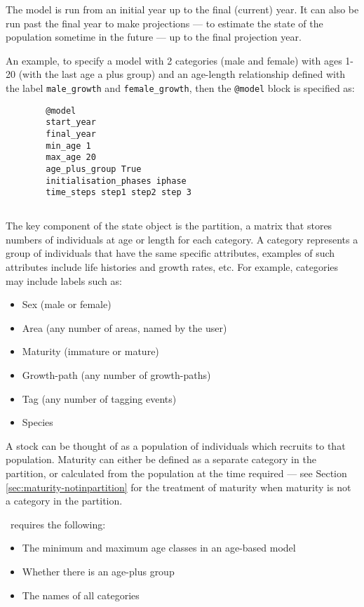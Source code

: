 The model is run from an initial year up to the final (current) year. It can also be run past the final year to make projections --- to estimate the state of the population sometime in the future --- up to the final projection year.

An example, to specify a model with 2 categories (male and female) with ages 1-20 (with the last age a plus group) and an age-length relationship defined with the label \texttt{male\_growth} and \texttt{female\_growth}, then the \texttt{@model} block is specified as:
{\small{\begin{verbatim}
		@model
		start_year
		final_year
		min_age 1
		max_age 20
		age_plus_group True
		initialisation_phases iphase
		time_steps step1 step2 step 3
\end{verbatim}}}

\subsection{}

The key component of the state object is the partition, a matrix that stores numbers of individuals at age or length for each category. A category represents a group of individuals that have the same specific attributes, examples of such attributes include life histories and growth rates, etc. For example, categories may include labels such as:

\begin{itemize}
\item Sex (male or female)
\item Area (any number of areas, named by the user)
\item Maturity (immature or mature)
\item Growth-path (any number of growth-paths)
\item Tag (any number of tagging events)
\item Species
\end{itemize}

A stock can be thought of as a population of individuals which recruits to that population. Maturity can either be defined as a separate category in the partition, or calculated from the population at the time required --- see Section \ref{sec:maturity-notinpartition} for the treatment of maturity when maturity is not a category in the partition. 

\CNAME\ requires the following: 

\begin{itemize}
\item	The minimum and maximum age classes in an age-based model
\item	Whether there is an age-plus group
\item The names of all categories
\end{itemize}

